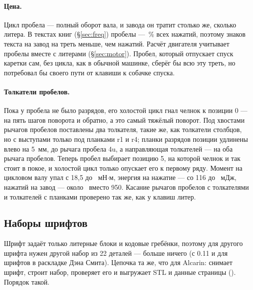 \paragraph{Цена.} Цикл пробела — полный оборот вала, и завода он тратит столько же, сколько литера. В текстах книг (\S\ref{sec:freq}) пробелы — \fqSP\,\% всех нажатий, поэтому знаков текста на завод на треть меньше, чем нажатий. Расчёт двигателя учитывает пробелы вместе с литерами (\S\ref{sec:motor}). Пробел, который отпускает спуск каретки сам, без цикла, как в обычной машинке, сберёг бы всю эту треть, но потребовал бы своего пути от клавиши к собачке спуска.

\paragraph{Толкатели пробелов.}\label{sec:spacepush} Пока у пробела не было разрядов, его холостой цикл гнал челнок к позиции 0 — на пять шагов поворота и обратно, а это самый тяжёлый поворот. Под хвостами рычагов пробелов поставлены два толкателя, такие же, как толкатели столбцов, но с выступами только под планками r1 и r4; планки разрядов позиции удлинены влево на 5~мм, до рычага пробела 4u, а направляющая толкателей — на оба рычага пробелов. Теперь пробел выбирает позицию 5, на которой челнок и так стоит в покое, и холостой цикл только опускает его к первому ряду. Момент на цикловом валу упал с 18,5 до \mtauC~мН$\cdot$м, энергия на нажатие — со 116 до \mEchar~мДж, нажатий на завод — около \mcharswind\ вместо 950. Касание рычагов пробелов с толкателями и толкателей с планками проверено так же, как у клавиш литер.

\subsection{Наборы шрифтов}
\label{sec:fontsets}

Шрифт задаёт только литерные блоки и кодовые гребёнки, поэтому для другого шрифта нужен другой набор из 22 деталей — больше ничего (с 0.11 и для шрифтов в раскладке Дэна Смита). Цепочка та же, что для Alcarin:  снимает шрифт,  строит набор, проверяет его и выгружает STL и данные страницы (). Порядок такой.

